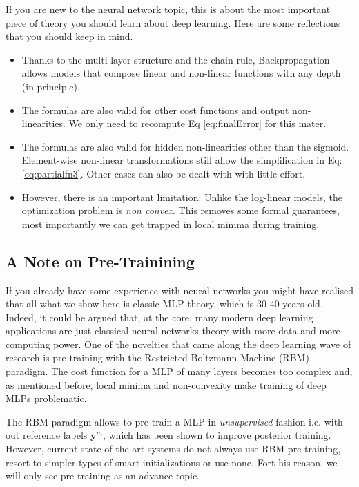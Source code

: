 If you are new to the neural network topic, this is about the most important
piece of theory you should learn about deep learning. Here are some reflections
that you should keep in mind.

\begin{itemize}
\item Thanks to the multi-layer structure and the chain rule, Backpropagation allows models that compose linear and non-linear functions with any depth (in principle\footnotemark). 
\item The formulas are also valid for other cost functions and output non-linearities. We only need to recompute Eq \ref{eq:finalError} for this mater.  
\item The formulas are also valid for hidden non-linearities other than the sigmoid. Element-wise non-linear transformations still allow the simplification in Eq: \ref{eq:partialfn3}. Other cases can also be dealt with with little effort.
\item However, there is an important limitation: Unlike the log-linear models, the optimization problem is \textit{non convex}. This removes some formal guarantees, most importantly we can get trapped in local minima during training.
\end{itemize}


\subsection{A Note on Pre-Trainining}

If you already have some experience with neural networks you might have
realised that all what we show here is classic MLP theory, which is 30-40 years
old. Indeed, it could be argued that, at the core, many modern deep learning
applications are just classical neural networks theory with more data and more
computing power. One of the novelties that came along the deep learning wave of
research is pre-training with the Restricted Boltzmann Machine (RBM) paradigm.
The cost function for a MLP of many layers becomes too complex and, as
mentioned before, local minima and non-convexity make training of deep MLPs
problematic. 

The RBM paradigm allows to pre-train a MLP in \textit{unsupervised} fashion
i.e. with out reference labels $\mathbf{y}^m$, which has been shown to improve
posterior training. However, current state of the art systems do not always use
RBM pre-training, resort to simpler types of smart-initializations or use none.
Fort his reason, we will only see pre-training as an advance topic.  

